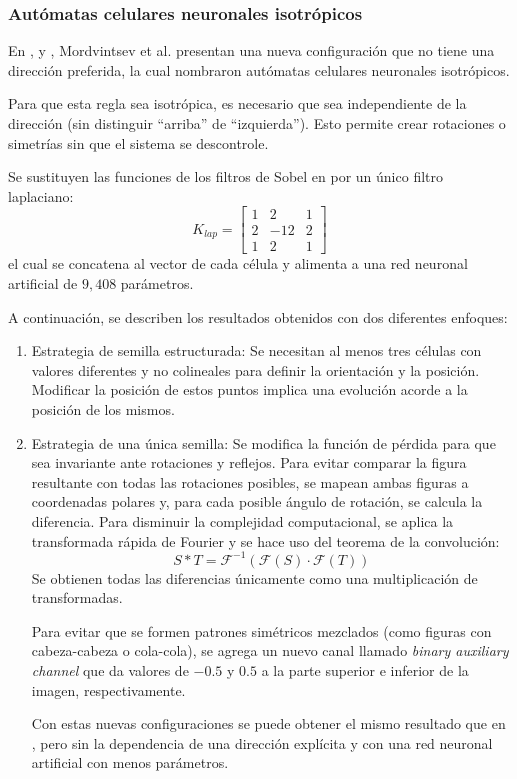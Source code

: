 \subsubsection{Autómatas celulares neuronales isotrópicos}

En \cite{mordvintsev2022_iso_nca}, \cite{mordvintsev2022_iso_nca2} y \cite{mordvintsev2023_snca}, Mordvintsev et al. presentan una nueva configuración que no tiene una dirección preferida, la cual nombraron autómatas celulares neuronales isotrópicos.

Para que esta regla sea isotrópica, es necesario que sea independiente de la dirección (sin distinguir ``arriba'' de ``izquierda''). Esto permite crear rotaciones o simetrías sin que el sistema se descontrole.

Se sustituyen las funciones de los filtros de Sobel en \cite{mordvintsev2020_nca} por un único filtro laplaciano:
\[
K_{lap} = \begin{bmatrix}
	1 & 2 & 1 \\
	2 & -12 & 2 \\
	1 & 2 & 1 	
\end{bmatrix}
\]
el cual se concatena al vector de cada célula y alimenta a una red neuronal artificial de $9{,}408$ parámetros. 

A continuación, se describen los resultados obtenidos con dos diferentes enfoques:
\begin{enumerate}
	\item Estrategia de semilla estructurada: Se necesitan al menos tres células con valores diferentes y no colineales para definir la orientación y la posición. Modificar la posición de estos puntos implica una evolución acorde a la posición de los mismos.
	
	\item Estrategia de una única semilla: Se modifica la función de pérdida para que sea invariante ante rotaciones y reflejos. Para evitar comparar la figura resultante con todas las rotaciones posibles, se mapean ambas figuras a coordenadas polares y, para cada posible ángulo de rotación, se calcula la diferencia. Para disminuir la complejidad computacional, se aplica la transformada rápida de Fourier y se hace uso del teorema de la convolución:
	\[
	S * T = \mathcal{F}^{-1} (\mathcal{F}(S) \cdot \mathcal{F}(T)) 
	\]
	Se obtienen todas las diferencias únicamente como una multiplicación de transformadas.
	
	Para evitar que se formen patrones simétricos mezclados (como figuras con cabeza-cabeza o cola-cola), se agrega un nuevo canal llamado \textit{binary auxiliary channel} que da valores de $-0.5$ y $0.5$ a la parte superior e inferior de la imagen, respectivamente.
	
	Con estas nuevas configuraciones se puede obtener el mismo resultado que en \cite{mordvintsev2020_nca}, pero sin la dependencia de una dirección explícita y con una red neuronal artificial con menos parámetros.
	
\end{enumerate}


